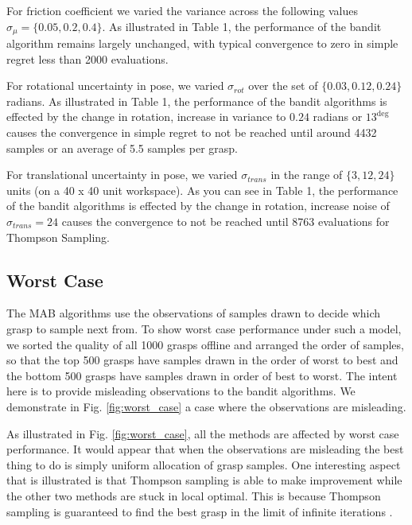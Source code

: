 \documentclass[10pt, conference]{ieeeconf}      %
\begin{document}
For friction coefficient we varied the variance across the following values $\sigma_{\mu} = \lbrace 0.05, 0.2, 0.4 \rbrace$. As illustrated in Table 1, the performance of the bandit algorithm remains largely unchanged, with typical convergence to zero in simple regret less than 2000 evaluations.

For rotational uncertainty in pose, we varied $\sigma_{rot}$ over the set of $\lbrace 0.03, 0.12,0.24\rbrace$ radians. As illustrated in Table 1, the performance of the bandit algorithms is effected by the change in rotation, increase in variance to $0.24$ radians or $13^{\deg}$  causes the convergence in simple regret to not be reached until around 4432 samples or an average of 5.5 samples per grasp. 

For translational uncertainty in pose, we varied $\sigma_{trans}$ in the range of $\lbrace 3,12, 24 \rbrace$ units (on a 40 x 40 unit workspace). As you can see in Table 1, the performance of the bandit algorithms is effected by the change in rotation, increase noise of $\sigma_{trans} = 24$ causes the convergence to not be reached until 8763 evaluations for Thompson Sampling. 



\subsection{Worst Case}
The MAB algorithms use the observations of samples drawn to decide which grasp to sample next from. To show worst case performance under such a model, we sorted the quality of all 1000 grasps offline and arranged the order of samples, so that the top 500 grasps have samples drawn in the order of worst to best and the bottom 500 grasps have samples drawn in order of best to worst. The intent here is to provide misleading observations to the bandit algorithms. We demonstrate in Fig. \ref{fig:worst_case} a case where the observations are misleading. 

As illustrated in Fig. \ref{fig:worst_case}, all the methods are affected by worst case performance. It would appear that when the observations are misleading the best thing to do is simply uniform allocation of grasp samples. One interesting aspect that is illustrated is that Thompson sampling is able to make improvement while the other two methods are stuck in local optimal. This is because Thompson sampling is guaranteed to find the best grasp in the limit of infinite iterations \cite{agrawal2011analysis}.
\end{document}
